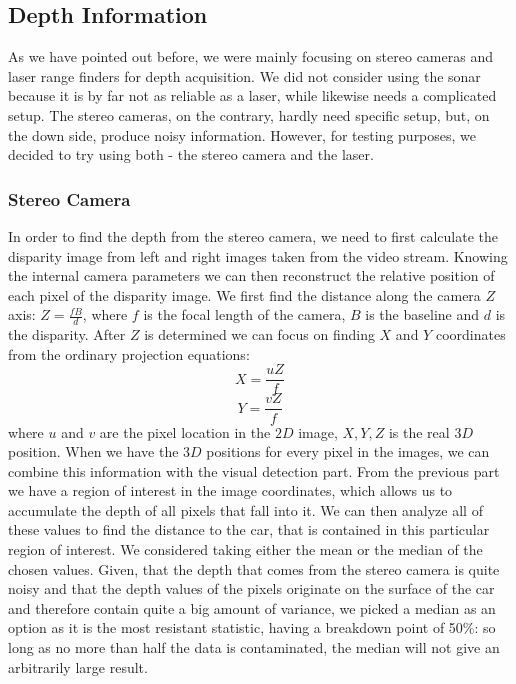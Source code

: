     \subsection{Depth Information} %
    \label{sub:depth_information}
        As we have pointed out before, we were mainly focusing on stereo cameras and laser range finders for depth acquisition. We did not consider using the sonar because it is by far not as reliable as a laser, while likewise needs a complicated setup. The stereo cameras, on the contrary, hardly need specific setup, but, on the down side, produce noisy information. However, for testing purposes, we decided to try using both - the stereo camera and the laser.
        \subsubsection{Stereo Camera} %
        \label{ssub:stereo_camera}
            In order to find the depth from the stereo camera, we need to first calculate the disparity image from left and right images taken from the video stream.
            Knowing the internal camera parameters we can then reconstruct the relative position of each pixel of the disparity image.
            We first find the distance along the camera $Z$ axis: $Z = \frac{fB}{d}$, where $f$ is the focal length of the camera, $B$ is the baseline and $d$ is the disparity.
            After $Z$ is determined we can focus on finding $X$ and $Y$ coordinates from the ordinary projection equations:
            $$X = \frac{uZ}{f}$$
            $$Y = \frac{vZ}{f}$$
            where $u$ and $v$ are the pixel location in the $2D$ image, $X, Y, Z$ is the real $3D$ position.
            When we have the $3D$ positions for every pixel in the images, we can combine this information with the visual detection part. From the previous part we have a region of interest in the image coordinates, which allows us to accumulate the depth of all pixels that fall into it. We can then analyze all of these values to find the distance to the car, that is contained in this particular region of interest.
            We considered taking either the mean or the median of the chosen values. Given, that the depth that comes from the stereo camera is quite noisy and that the depth values of the pixels originate on the surface of the car and therefore contain quite a big amount of variance, we picked a median as an option as it is the most resistant statistic, having a breakdown point of 50$\%$: so long as no more than half the data is contaminated, the median will not give an arbitrarily large result.
